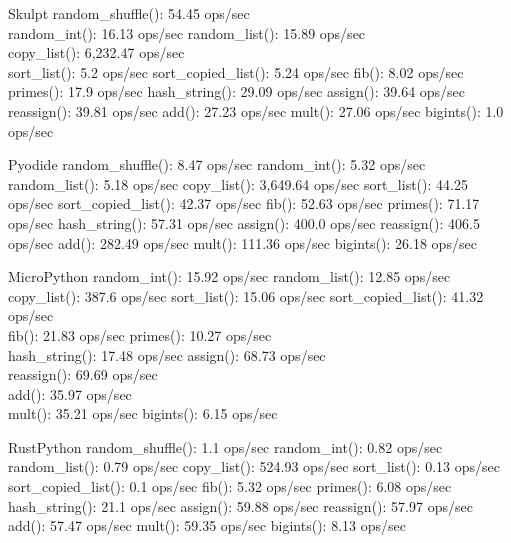 \begin{frame}{Skulpt}
\label{notes__03010-python-web.md__skulpt}
random\_shuffle(): 54.45 ops/sec\\
random\_int(): 16.13 ops/sec
random\_list(): 15.89 ops/sec\\
copy\_list(): 6,232.47 ops/sec\\
sort\_list(): 5.2 ops/sec
sort\_copied\_list(): 5.24 ops/sec
fib(): 8.02 ops/sec
primes(): 17.9 ops/sec
hash\_string(): 29.09 ops/sec
assign(): 39.64 ops/sec
reassign(): 39.81 ops/sec
add(): 27.23 ops/sec
mult(): 27.06 ops/sec
bigints(): 1.0 ops/sec
\end{frame}

\begin{frame}{Pyodide}
\label{notes__03010-python-web.md__pyodide}
random\_shuffle(): 8.47 ops/sec
random\_int(): 5.32 ops/sec
random\_list(): 5.18 ops/sec
copy\_list(): 3,649.64 ops/sec
sort\_list(): 44.25 ops/sec
sort\_copied\_list(): 42.37 ops/sec
fib(): 52.63 ops/sec
primes(): 71.17 ops/sec
hash\_string(): 57.31 ops/sec
assign(): 400.0 ops/sec
reassign(): 406.5 ops/sec
add(): 282.49 ops/sec
mult(): 111.36 ops/sec
bigints(): 26.18 ops/sec
\end{frame}

\begin{frame}{MicroPython}
\label{notes__03010-python-web.md__micropython}
random\_int(): 15.92 ops/sec
random\_list(): 12.85 ops/sec\\
copy\_list(): 387.6 ops/sec
sort\_list(): 15.06 ops/sec
sort\_copied\_list(): 41.32 ops/sec\\
fib(): 21.83 ops/sec
primes(): 10.27 ops/sec\\
hash\_string(): 17.48 ops/sec
assign(): 68.73 ops/sec\\
reassign(): 69.69 ops/sec\\
add(): 35.97 ops/sec\\
mult(): 35.21 ops/sec
bigints(): 6.15 ops/sec
\end{frame}

\begin{frame}{RustPython}
\label{notes__03010-python-web.md__rustpython}
random\_shuffle(): 1.1 ops/sec
random\_int(): 0.82 ops/sec
random\_list(): 0.79 ops/sec
copy\_list(): 524.93 ops/sec
sort\_list(): 0.13 ops/sec
sort\_copied\_list(): 0.1 ops/sec
fib(): 5.32 ops/sec
primes(): 6.08 ops/sec
hash\_string(): 21.1 ops/sec
assign(): 59.88 ops/sec
reassign(): 57.97 ops/sec
add(): 57.47 ops/sec
mult(): 59.35 ops/sec
bigints(): 8.13 ops/sec
\end{frame}

